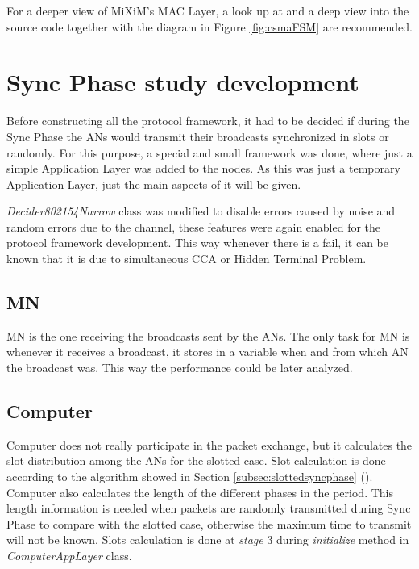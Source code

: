For a deeper view of \ac{MiXiM}'s \ac{MAC} Layer, a look up at \cite{MiXiM} and a deep view into the source code together with the diagram in Figure 
\ref{fig:csmaFSM} are recommended.


\section{Sync Phase study development}

Before constructing all the protocol framework, it had to be decided if during the Sync Phase the \acp{AN} would transmit their broadcasts 
synchronized in slots or randomly. For this purpose, a special and small framework was done, where just a simple Application Layer was added to 
the nodes. As this was just a temporary Application Layer, just the main aspects of it will be given.

\textit{Decider802154Narrow} class was modified to disable errors caused by noise and random errors due to the channel, these features were 
again enabled for the protocol framework development. This way whenever there is a fail, it can be known that it is due to simultaneous \ac{CCA}
or Hidden Terminal Problem.

\subsection{\ac{MN}}

\ac{MN} is the one receiving the broadcasts sent by the \acp{AN}. The only task for \ac{MN} is whenever it receives a broadcast, it stores in a
variable when and from which \ac{AN} the broadcast was. This way the performance could be later analyzed.

\subsection{Computer}

Computer does not really participate in the packet exchange, but it calculates the slot distribution among the \acp{AN} for the slotted case. 
Slot calculation is done according to the algorithm showed in Section \ref{subsec:slottedsyncphase} (). Computer 
also calculates the length of the different phases in the period. This length information is needed when packets are randomly transmitted 
during Sync Phase to compare with the slotted case, otherwise the maximum time to transmit will not be known. Slots calculation is done at
\textit{stage} 3 during \textit{initialize} method in \textit{ComputerAppLayer} class.

